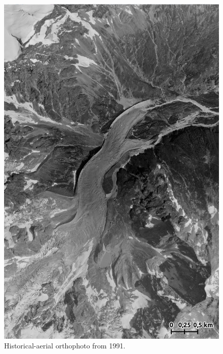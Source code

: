\begin{figure}[p]
    \centering
    \includegraphics[height=\textheight]{figures/appendix/orto_1991.jpg}
    \caption{Historical-aerial orthophoto from 1991.}
\end{figure}

